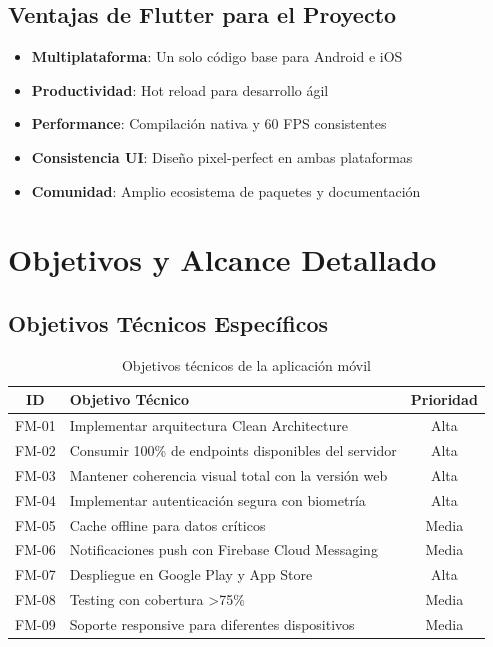 \documentclass[12pt]{article}
\begin{document}
\subsection{Ventajas de Flutter para el Proyecto}
\begin{itemize}
    \item \textbf{Multiplataforma}: Un solo código base para Android e iOS
    \item \textbf{Productividad}: Hot reload para desarrollo ágil
    \item \textbf{Performance}: Compilación nativa y 60 FPS consistentes
    \item \textbf{Consistencia UI}: Diseño pixel-perfect en ambas plataformas
    \item \textbf{Comunidad}: Amplio ecosistema de paquetes y documentación
\end{itemize}

\section{Objetivos y Alcance Detallado}
\label{sec:objetivos}

\subsection{Objetivos Técnicos Específicos}
\begin{table}[H]
\centering
\begin{tabularx}{\textwidth}{|c|X|c|}
\hline
\textbf{ID} & \textbf{Objetivo Técnico} & \textbf{Prioridad} \\
\hline
FM-01 & Implementar arquitectura Clean Architecture & Alta \\
\hline
FM-02 & Consumir 100\% de endpoints disponibles del servidor & Alta \\
\hline
FM-03 & Mantener coherencia visual total con la versión web & Alta \\
\hline
FM-04 & Implementar autenticación segura con biometría & Alta \\
\hline
FM-05 & Cache offline para datos críticos & Media \\
\hline
FM-06 & Notificaciones push con Firebase Cloud Messaging & Media \\
\hline
FM-07 & Despliegue en Google Play y App Store & Alta \\
\hline
FM-08 & Testing con cobertura >75\% & Media \\
\hline
FM-09 & Soporte responsive para diferentes dispositivos & Media \\
\hline
\end{tabularx}
\caption{Objetivos técnicos de la aplicación móvil}
\end{table}
\end{document}
